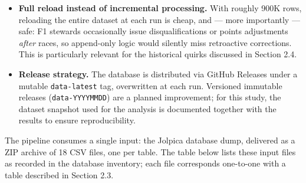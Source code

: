 \documentclass[
]{article}
\providecommand{\tightlist}{%
  \setlength{\itemsep}{0pt}\setlength{\parskip}{0pt}}
\begin{document}
\begin{itemize}
\tightlist
\item
  \textbf{Full reload instead of incremental processing.} With roughly
  900K rows, reloading the entire dataset at each run is cheap, and ---
  more importantly --- safe: F1 stewards occasionally issue
  disqualifications or points adjustments \emph{after} races, so
  append-only logic would silently miss retroactive corrections. This is
  particularly relevant for the historical quirks discussed in Section
  2.4.
\item
  \textbf{Release strategy.} The database is distributed via GitHub
  Releases under a mutable \texttt{data-latest} tag, overwritten at each
  run. Versioned immutable releases (\texttt{data-YYYYMMDD}) are a
  planned improvement; for this study, the dataset snapshot used for the
  analysis is documented together with the results to ensure
  reproducibility.
\end{itemize}

The pipeline consumes a single input: the Jolpica database dump,
delivered as a ZIP archive of 18 CSV files, one per table. The table
below lists these input files as recorded in the database inventory;
each file corresponds one-to-one with a table described in Section 2.3.
\end{document}

